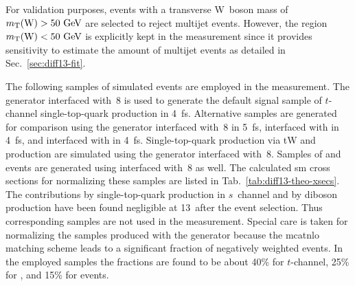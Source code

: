 For validation purposes, events with a transverse W~boson mass of $m_{\textrm{T}}(\textrm{W})>50~\textrm{GeV}$ are selected to reject multijet events. However, the region $m_{\textrm{T}}(\textrm{W})<50~\textrm{GeV}$ is explicitly kept in the measurement since it provides sensitivity to estimate the amount of multijet events as detailed in Sec.~\ref{sec:diff13-fit}.

The following samples of simulated events are employed in the measurement. The \MGAMC generator interfaced with \PYTHIA{}\,8 is used to generate the default signal sample of $t$-channel single-top-quark production in 4~\gls{fs}. Alternative samples are generated for comparison using the \MGAMC generator interfaced with \PYTHIA{}\,8 in 5~\gls{fs}, \MGAMC interfaced with \HERWIG in 4~\gls{fs}, and \POWHEG interfaced with \PYTHIA in 4~\gls{fs}. Single-top-quark production via tW and \ttbar production are simulated using the \POWHEG generator interfaced with \PYTHIA{}\,8. Samples of \wjets and \zjets events are generated using \MGAMC interfaced with \PYTHIA{}\,8 as well. The calculated \gls{sm} cross sections for normalizing these samples are listed in Tab.~\ref{tab:diff13-theo-xsecs}. The contributions by single-top-quark production in $s$~channel and by diboson production have been found negligible at 13~\TeV after the event selection. Thus corresponding samples are not used in the measurement. Special care is taken for normalizing the samples produced with the \MGAMC generator because the \gls{mcatnlo} matching scheme leads to a significant fraction of negatively weighted events. In the employed samples the fractions are found to be about 40\% for $t$-channel, 25\% for \zjets, and 15\% for \wjets events.


